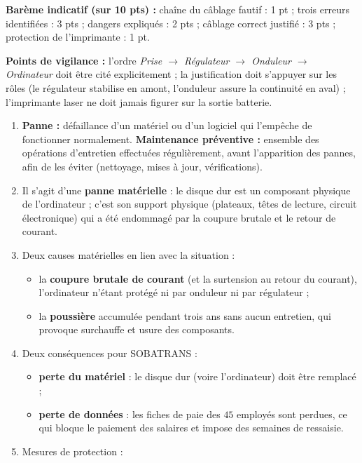 \documentclass[11pt]{article}
\begin{document}
\begin{corrige}
\textbf{Barème indicatif (sur 10 pts) :} chaîne du câblage fautif : 1 pt ; trois erreurs identifiées : 3 pts ; dangers expliqués : 2 pts ; câblage correct justifié : 3 pts ; protection de l'imprimante : 1 pt.

\textbf{Points de vigilance :} l'ordre \emph{Prise $\rightarrow$ Régulateur $\rightarrow$ Onduleur $\rightarrow$ Ordinateur} doit être cité explicitement ; la justification doit s'appuyer sur les rôles (le régulateur stabilise en amont, l'onduleur assure la continuité en aval) ; l'imprimante laser ne doit jamais figurer sur la sortie batterie.
\end{corrige}

\begin{corrige}
\begin{enumerate}
\item \textbf{Panne :} défaillance d'un matériel ou d'un logiciel qui l'empêche de fonctionner normalement. \textbf{Maintenance préventive :} ensemble des opérations d'entretien effectuées régulièrement, avant l'apparition des pannes, afin de les éviter (nettoyage, mises à jour, vérifications).
\item Il s'agit d'une \textbf{panne matérielle} : le disque dur est un composant physique de l'ordinateur ; c'est son support physique (plateaux, têtes de lecture, circuit électronique) qui a été endommagé par la coupure brutale et le retour de courant.
\item Deux causes matérielles en lien avec la situation :
\begin{itemize}
\item la \textbf{coupure brutale de courant} (et la surtension au retour du courant), l'ordinateur n'étant protégé ni par onduleur ni par régulateur ;
\item la \textbf{poussière} accumulée pendant trois ans sans aucun entretien, qui provoque surchauffe et usure des composants.
\end{itemize}
\item Deux conséquences pour SOBATRANS :
\begin{itemize}
\item \textbf{perte du matériel} : le disque dur (voire l'ordinateur) doit être remplacé ;
\item \textbf{perte de données} : les fiches de paie des $45$ employés sont perdues, ce qui bloque le paiement des salaires et impose des semaines de ressaisie.
\end{itemize}
\item Mesures de protection :

\end{enumerate}
\end{corrige}
\end{document}
